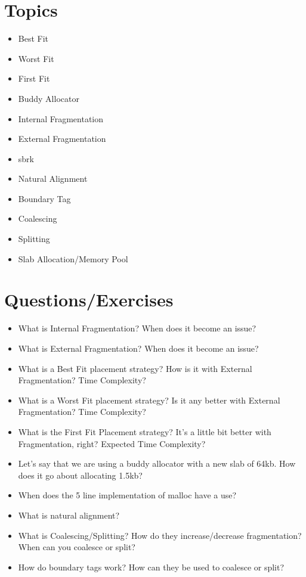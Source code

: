 \section{Topics}

\begin{itemize}
\tightlist
\item
  Best Fit
\item
  Worst Fit
\item
  First Fit
\item
  Buddy Allocator
\item
  Internal Fragmentation
\item
  External Fragmentation
\item
  sbrk
\item
  Natural Alignment
\item
  Boundary Tag
\item
  Coalescing
\item
  Splitting
\item
  Slab Allocation/Memory Pool
\end{itemize}

\section{Questions/Exercises}

\begin{itemize}
\tightlist
\item
  What is Internal Fragmentation? When does it become an issue?
\item
  What is External Fragmentation? When does it become an issue?
\item
  What is a Best Fit placement strategy? How is it with External Fragmentation? Time Complexity?
\item
  What is a Worst Fit placement strategy? Is it any better with External Fragmentation? Time Complexity?
\item
  What is the First Fit Placement strategy? It's a little bit better with Fragmentation, right? Expected Time Complexity?
\item
  Let's say that we are using a buddy allocator with a new slab of 64kb. How does it go about allocating 1.5kb?
\item
  When does the 5 line  implementation of malloc have a use?
\item
  What is natural alignment?
\item
  What is Coalescing/Splitting? How do they increase/decrease fragmentation? When can you coalesce or split?
\item
  How do boundary tags work? How can they be used to coalesce or split?
\end{itemize}


